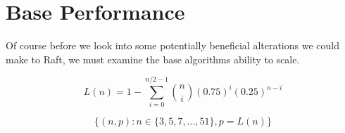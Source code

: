 \section{Base Performance}

Of course before we look into some potentially beneficial alterations we could make to Raft, we must examine the base algorithms ability to scale.

\[L(n) = 1- \sum_{i=0}^{n/2-1} {n \choose i}(0.75)^{i}(0.25)^{n-i}\]


\[\{(n, p): n \in \{3,5,7,...,51\}, p=L(n)\}\]